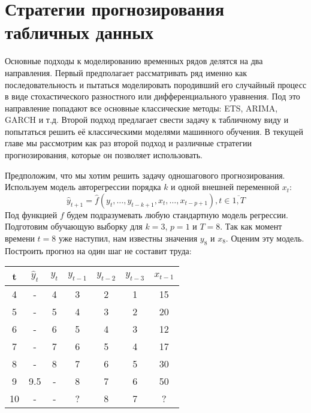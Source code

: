 \documentclass[12pt,fleqn]{article}
\begin{document}
\section{Стратегии прогнозирования табличных данных}

Основные подходы к моделированию временных рядов делятся на два направления. Первый предполагает рассматривать ряд именно как последовательность и пытаться моделировать породивший его случайный процесс в виде стохастического разностного или дифференциального уравнения. Под это направление попадают все основные классические методы: ETS, ARIMA, GARCH и т.д. Второй подход предлагает свести задачу к табличному виду и попытаться решить её классическими моделями машинного обучения. В текущей главе мы рассмотрим как раз второй подход и различные стратегии прогнозирования, которые он позволяет использовать.


Предположим, что мы хотим решить задачу одношагового прогнозирования. Используем модель авторегрессии порядка $k$ и одной внешней переменной $x_t$:  
$$
\hat{y}_{t+1} = \hat{f}(y_t, \ldots, y_{t-k+1}, x_{t}, \ldots, x_{t-p+1}), t \in \overline{1, T}
$$
 Под функцией $f$ будем подразумевать любую стандартную модель регрессии. Подготовим обучающую выборку для $k=3$, $p=1$ и $T=8$. Так как момент времени $t=8$ уже наступил, нам известны значения $y_8$ и $x_8$. Оценим эту модель. Построить прогноз на один шаг не составит труда:

\begin{table}[!h]
	\centering
\begin{tabular}{|c|c|c|cccc|}
	\hline
	t              & $\hat{y}_t$ & $y_t$ & $y_{t-1}$ & $y_{t-2}$ & $y_{t-3}$ & $x_{t-1}$ \\ \hline
	4                       & -         & 4              & 3                  & 2         & 1         & 15        \\
	5                       & -         & 5              & 4                  & 3         & 2         & 20        \\
	6                       & -         & 6              & 5                  & 4         & 3         & 12        \\
	7                       & -         & 7              & 6                  & 5         & 4         & 17        \\
	8                       & -         & 8              & 7                  & 6         & 5         & 30        \\ \hline
	9 & 9.5       & -              & 8                  & 7         & 6         & 50        \\
	10 &  -        & -              & ?                  & 8         & 7         & ?        \\ \hline
\end{tabular}
\end{table}
\end{document}
